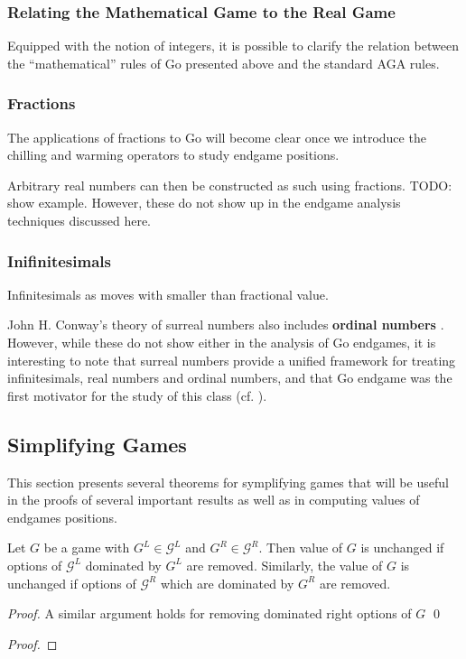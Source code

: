 \documentclass[../math194_paper.tex]{subfiles}
\begin{document}
\subsubsection{Relating the Mathematical Game to the Real Game}

Equipped with the notion of integers, it is possible to clarify the relation 
between the ``mathematical'' rules of Go presented above and the standard AGA 
rules.

\subsubsection{Fractions}

The applications of fractions to Go will become clear once we introduce 
the chilling and warming operators to study endgame positions. 

Arbitrary real numbers can then be constructed as such using fractions.
TODO: show example. 
However, these do not show up in the endgame analysis 
techniques discussed here.

\subsubsection{Inifinitesimals}

Infinitesimals as moves with smaller than fractional value. 

John H. Conway's theory of surreal numbers also includes \textbf{ordinal numbers} 
\cite{schleicher2006introduction}. However, while these do not show either in the analysis 
of Go endgames, it is interesting to note that surreal numbers provide a unified 
framework for treating infinitesimals, real numbers and ordinal numbers, and that 
Go endgame was the first motivator for the study of this class 
(cf. \cite[Prologue]{conway2000numbers}).

\subsection{Simplifying Games}

This section presents several theorems for symplifying games that will be 
useful in the proofs of several important results as well as in computing 
values of endgames positions. 

\begin{theorem}
    
\end{theorem}

\begin{theorem}
    Let $G$ be a game with $G^L \in \mathcal{G}^L$ and $G^R \in \mathcal{G}^R$.
    Then value of $G$ is unchanged if options of $\mathcal{G}^L$ dominated by $G^L$
    are removed. Similarly, the value of $G$ is unchanged if options of $\mathcal{G}^R$ 
    which are dominated by $G^R$ are removed. 
\end{theorem}

\begin{proof}
    A similar argument holds for removing dominated right options of $G$ \qed
\end{proof}

\begin{theorem}
\end{theorem}

\begin{proof}

\end{proof}
\end{document}
